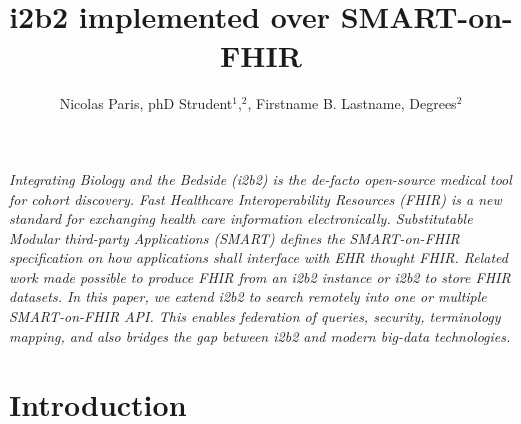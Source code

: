 \documentclass{amia}
\begin{document}
\title{i2b2 implemented over SMART-on-FHIR} 
\author{Nicolas Paris, phD Strudent$^{1}$,$^{2}$, Firstname B. Lastname, Degrees$^{2}$}


\maketitle


\textit{Integrating Biology and the Bedside (i2b2) is the de-facto open-source medical tool for cohort discovery. Fast Healthcare Interoperability Resources (FHIR) is a new standard for exchanging health care information electronically. Substitutable Modular third-party Applications (SMART) defines the SMART-on-FHIR specification on how applications shall interface with EHR thought FHIR. Related work made possible to produce FHIR from an i2b2 instance or i2b2 to store FHIR datasets. In this paper, we extend i2b2 to search remotely into one or multiple SMART-on-FHIR API. This enables federation of queries, security, terminology mapping, and also bridges the gap between i2b2 and modern big-data technologies.}

\section*{Introduction}
\end{document}
